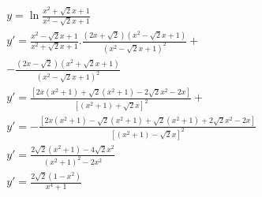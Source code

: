 \begin{ex}
\begin{align}
&y=\ln{\frac{x^2+\sqrt{2}x+1}{x^2-\sqrt{2}x+1}}\nonumber\\
&y'=\frac{x^2-\sqrt{2}x+1}{x^2+\sqrt{2}x+1}.\frac{(2x+\sqrt{2})(x^2-\sqrt{2}x+1)}{(x^2-\sqrt{2}x+1)^2}+\nonumber\\
&-\frac{(2x-\sqrt{2})(x^2+\sqrt{2}x+1)}{(x^2-\sqrt{2}x+1)^2}\nonumber\\
&y'=\frac{[2x(x^2+1)+\sqrt{2}(x^2+1)-2\sqrt{2}x^2-2x]}{[(x^2+1)+\sqrt{2}x]^2}+\nonumber\\
&y'=-\frac{[2x(x^2+1)-\sqrt{2}(x^2+1)+\sqrt{2}(x^2+1)+2\sqrt{2}x^2-2x]}{[(x^2+1)-\sqrt{2}x]^2}\nonumber\\
&y'=\frac{2\sqrt{2}(x^2+1)-4\sqrt{2}x^2}{(x^2+1)^2-2x^2}\nonumber\\
&y'=\frac{2\sqrt{2}(1-x^2)}{x^4+1}\nonumber
\end{align}
\end{ex}
